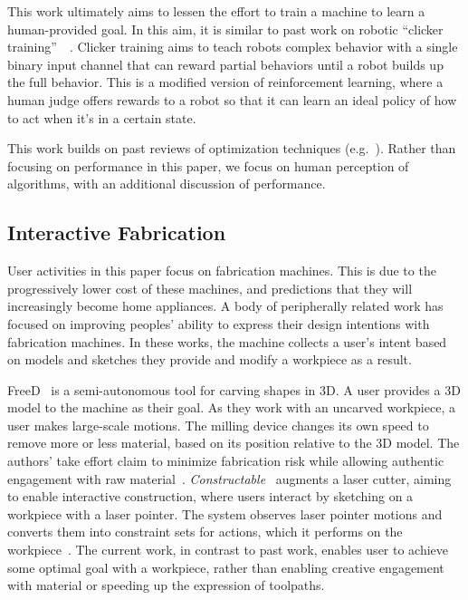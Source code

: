 This work ultimately aims to lessen the effort to train a machine to learn a human-provided goal.
In this aim, it is similar to past work on robotic ``clicker training''~\cite{kaplan_robotic_2002}~\cite{grollman_dogged_2007}.
Clicker training aims to teach robots complex behavior with a single binary input channel that can reward partial behaviors until a robot builds up the full behavior.
This is a modified version of reinforcement learning, where a human judge offers rewards to a robot so that it can learn an ideal policy of how to act when it's in a certain state.

This work builds on past reviews of optimization techniques (e.g.~\cite{hansen_comparing_2010,mersmann_benchmarking_2010}).
Rather than focusing on performance in this paper, we focus on human perception of algorithms, with an additional discussion of performance.

\subsection{Interactive Fabrication}

User activities in this paper focus on fabrication machines.
This is due to the progressively lower cost of these machines, and predictions that they will increasingly become home appliances.
A body of peripherally related work has focused on improving peoples' ability to express their design intentions with fabrication machines.
In these works, the machine collects a user's intent based on models and sketches they provide and modify a workpiece as a result.

FreeD~\cite{zoran_human-computer_2013,zoran_hybrid_2014} is a semi-autonomous tool for carving shapes in 3D.
A user provides a 3D model to the machine as their goal.
As they work with an uncarved workpiece, a user makes large-scale motions.
The milling device changes its own speed to remove more or less material, based on its position relative to the 3D model.
The authors' take effort claim to minimize fabrication risk while allowing authentic engagement with raw material~\cite{zoran_hybrid_2014}.
\emph{Constructable}~\cite{mueller_interactive_2012} augments a laser cutter, aiming to enable interactive construction, where users interact by sketching on a workpiece with a laser pointer.
The system observes laser pointer motions and converts them into constraint sets for actions, which it performs on the workpiece~\cite{mueller_interactive_2012,mueller_laserorigami_2013}.
The current work, in contrast to past work, enables user to achieve some optimal goal with a workpiece, rather than enabling creative engagement with material or speeding up the expression of toolpaths.

